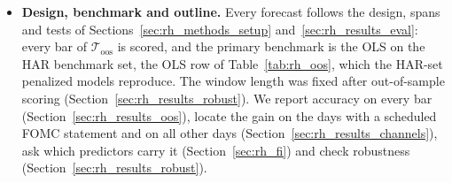 \begin{itemize}
\item \textbf{Design, benchmark and outline.} Every forecast follows the design, spans and tests of
  Sections~\ref{sec:rh_methods_setup} and~\ref{sec:rh_results_eval}: every bar of $\mathcal T_{\mathrm{oos}}$ is
  scored, and the primary benchmark is the OLS on the HAR benchmark set, the OLS row of Table~\ref{tab:rh_oos}, which
  the HAR-set penalized models reproduce. The window length was fixed after out-of-sample scoring
  (Section~\ref{sec:rh_results_robust}). We report accuracy on every bar (Section~\ref{sec:rh_results_oos}), locate
  the gain on the days with a scheduled FOMC statement and on all other days (Section~\ref{sec:rh_results_channels}),
  ask which predictors carry it (Section~\ref{sec:rh_fi}) and check robustness (Section~\ref{sec:rh_results_robust}).
\end{itemize}


